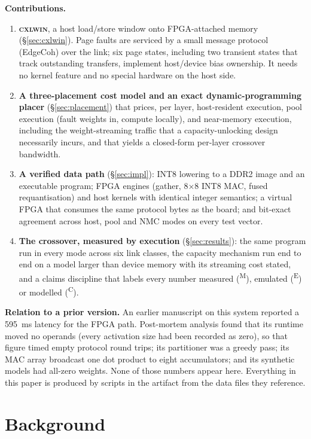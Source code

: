 \documentclass[lettersize,journal]{IEEEtran}
\newcommand{\cxlwin}{\textsc{cxlwin}}
\newcommand{\M}{\textsuperscript{M}}
\newcommand{\E}{\textsuperscript{E}}
\newcommand{\Cm}{\textsuperscript{C}}
\begin{document}
\textbf{Contributions.}
\begin{enumerate}
\item \textbf{\cxlwin{}}, a host load/store window onto FPGA-attached memory (\S\ref{sec:cxlwin}). Page faults are serviced by a small message protocol (EdgeCoh) over the link; six page states, including two transient states that track outstanding transfers, implement host/device bias ownership. It needs no kernel feature and no special hardware on the host side.
\item \textbf{A three-placement cost model and an exact dynamic-programming placer} (\S\ref{sec:placement}) that prices, per layer, host-resident execution, pool execution (fault weights in, compute locally), and near-memory execution, including the weight-streaming traffic that a capacity-unlocking design necessarily incurs, and that yields a closed-form per-layer crossover bandwidth.
\item \textbf{A verified data path} (\S\ref{sec:impl}): INT8 lowering to a DDR2 image and an executable program; FPGA engines (gather, 8$\times$8 INT8 MAC, fused requantisation) and host kernels with identical integer semantics; a virtual FPGA that consumes the same protocol bytes as the board; and bit-exact agreement across host, pool and NMC modes on every test vector.
\item \textbf{The crossover, measured by execution} (\S\ref{sec:results}): the same program run in every mode across six link classes, the capacity mechanism run end to end on a model larger than device memory with its streaming cost stated, and a claims discipline that labels every number measured (\M), emulated (\E) or modelled (\Cm).
\end{enumerate}

\textbf{Relation to a prior version.} An earlier manuscript on this system reported a 595~ms latency for the FPGA path. Post-mortem analysis found that its runtime moved no operands (every activation size had been recorded as zero), so that figure timed empty protocol round trips; its partitioner was a greedy pass; its MAC array broadcast one dot product to eight accumulators; and its synthetic models had all-zero weights. None of those numbers appear here. Everything in this paper is produced by scripts in the artifact from the data files they reference.

\section{Background}
\label{sec:background}
\end{document}
